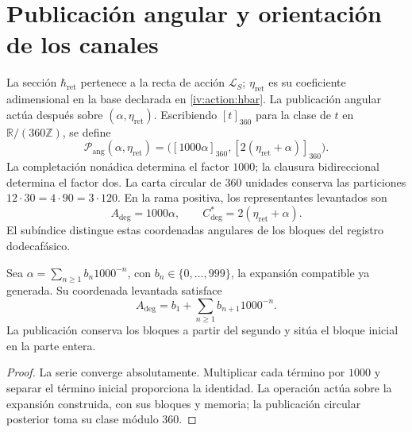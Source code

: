 \section{Publicación angular y orientación de los canales}
\label{iv:angular:section}

La sección \(\hbar_{\mathrm{ret}}\) pertenece a la recta de
acción \(\mathcal L_S\); \(\eta_{\mathrm{ret}}\) es su
coeficiente adimensional en la base declarada en
\eqref{iv:action:hbar}. La publicación angular actúa después
sobre \((\alpha,\eta_{\mathrm{ret}})\). Escribiendo
\([t]_{360}\) para la clase de \(t\) en
\(\mathbb R/(360\mathbb Z)\), se define
\begin{equation}
 \mathcal P_{\mathrm{ang}}(\alpha,\eta_{\mathrm{ret}})
 =\bigl([1000\alpha]_{360},
        [2(\eta_{\mathrm{ret}}+\alpha)]_{360}\bigr).
 \label{iv:angular:publicacion}
\end{equation}
La completación nonádica determina el factor \(1000\); la
clausura bidireccional determina el factor dos. La carta circular
de \(360\) unidades conserva las particiones
\(12\cdot30=4\cdot90=3\cdot120\). En la rama positiva, los
representantes levantados son
\begin{equation}
 A_{\deg}=1000\alpha,\qquad
 C^*_{\deg}=2(\eta_{\mathrm{ret}}+\alpha).
 \label{iv:angular:representantes}
\end{equation}
El subíndice distingue estas coordenadas angulares de los bloques
del registro dodecafásico.

\begin{proposition}
\label{iv:angular:desplazamiento}
Sea \(\alpha=\sum_{n\geq1}b_n1000^{-n}\), con
\(b_n\in\{0,\ldots,999\}\), la expansión compatible ya
generada. Su coordenada levantada satisface
\[
 A_{\deg}=b_1+\sum_{n\geq1}b_{n+1}1000^{-n}.
\]
La publicación conserva los bloques a partir del segundo y
sitúa el bloque inicial en la parte entera.
\end{proposition}
\begin{proof}
La serie converge absolutamente. Multiplicar cada término por
\(1000\) y separar el término inicial proporciona la identidad.
La operación actúa sobre la expansión construida, con sus
bloques y memoria; la publicación circular posterior toma
su clase módulo \(360\).
\end{proof}

